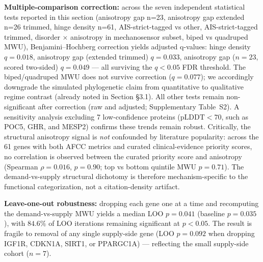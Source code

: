 \textbf{Multiple-comparison correction:} across the seven independent statistical tests reported in this section (anisotropy gap n=23, anisotropy gap extended n=26 trimmed, hinge density n=61, AIS-strict-tagged vs other, AIS-strict-tagged trimmed, disorder $\times$ anisotropy in mechanosensor subset, biped vs quadruped MWU), Benjamini--Hochberg correction yields adjusted q-values: hinge density $q = 0.018$, anisotropy gap (extended trimmed) $q = 0.033$, anisotropy gap ($n=23$, scored two-sided) $q = 0.049$ --- all surviving the $q < 0.05$ FDR threshold. The biped/quadruped MWU does not survive correction ($q = 0.077$); we accordingly downgrade the simulated phylogenetic claim from quantitative to qualitative regime contrast (already noted in Section §3.1). All other tests remain non-significant after correction (raw and adjusted; Supplementary Table~S2). A sensitivity analysis excluding 7 low-confidence proteins ($\text{pLDDT} < 70$, such as POC5, GHR, and MESP2) confirms these trends remain robust. Critically, the structural anisotropy signal is \emph{not} confounded by literature popularity: across the 61 genes with both AFCC metrics and curated clinical-evidence priority scores, no correlation is observed between the curated priority score and anisotropy (Spearman $\rho = 0.016$, $p = 0.90$; top vs bottom quintile MWU $p = 0.71$). The demand-vs-supply structural dichotomy is therefore mechanism-specific to the functional categorization, not a citation-density artifact.

\textbf{Leave-one-out robustness:} dropping each gene one at a time and recomputing the demand-vs-supply MWU yields a median LOO $p = 0.041$ (baseline $p = 0.035$), with $84.6\%$ of LOO iterations remaining significant at $p < 0.05$. The result is fragile to removal of any single supply-side gene (LOO $p = 0.092$ when dropping IGF1R, CDKN1A, SIRT1, or PPARGC1A) --- reflecting the small supply-side cohort ($n = 7$).

